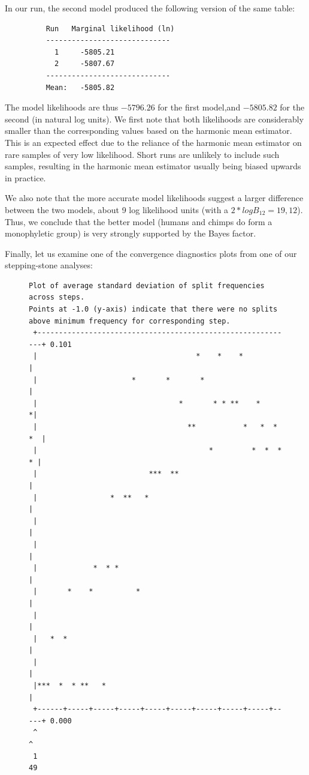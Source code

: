 \documentclass[12pt]{book}
\begin{document}
In our run, the second model produced the following version of the same table:

\begin{figure}[H]
\centering
\begin{BVerbatim}
    Run   Marginal likelihood (ln)
    -----------------------------
      1     -5805.21
      2     -5807.67
    -----------------------------
    Mean:   -5805.82
\end{BVerbatim}
\end{figure}

The model likelihoods are thus $-5796.26$ for the first model,and $-5805.82$ for the second (in
natural log units). We first note that both likelihoods are considerably smaller than the
corresponding values based on the harmonic mean estimator. This is an expected effect due to the
reliance of the harmonic mean estimator on rare samples of very low likelihood. Short runs are
unlikely to include such samples, resulting in the harmonic mean estimator usually being biased
upwards in practice.

We also note that the more accurate model likelihoods suggest a larger difference between the two
models, about 9 log likelihood units (with a $2*logB_{12} = 19,12$). Thus, we conclude that the
better model (humans and chimps do form a monophyletic group) is very strongly supported by the
Bayes factor.

Finally, let us examine one of the convergence diagnostics plots from one of our stepping-stone
analyses:

\begin{figure}[H]
\centering
\begin{BVerbatim}[fontsize=\scriptsize]
Plot of average standard deviation of split frequencies across steps.
Points at -1.0 (y-axis) indicate that there were no splits
above minimum frequency for corresponding step.
 +------------------------------------------------------------+ 0.101
 |                                     *    *    *            |
 |                      *       *       *                     |
 |                                 *       * * **    *       *|
 |                                   **           *   *  * *  |
 |                                        *         *  *  * * |
 |                          ***  **                           |
 |                 *  **   *                                  |
 |                                                            |
 |                                                            |
 |             *  * *                                         |
 |       *    *          *                                    |
 |                                                            |
 |   *  *                                                     |
 |                                                            |
 |***  *  * **   *                                            |
 +------+-----+-----+-----+-----+-----+-----+-----+-----+-----+ 0.000
 ^                                                            ^
 1                                                           49
\end{BVerbatim}
\end{figure}
\end{document}
